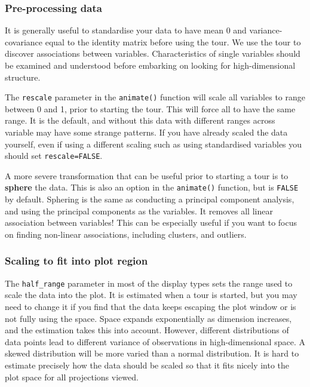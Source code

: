 \documentclass[
  letterpaper,
]{book}
\begin{document}
\hypertarget{pre-processing-data}{%
\subsubsection{Pre-processing data}\label{pre-processing-data}}

It is generally useful to standardise your data to have mean 0 and
variance-covariance equal to the identity matrix before using the tour.
We use the tour to discover associations between variables.
Characteristics of single variables should be examined and understood
before embarking on looking for high-dimensional structure.

The \texttt{rescale} parameter in the \texttt{animate()} function will
scale all variables to range between 0 and 1, prior to starting the
tour. This will force all to have the same range. It is the default, and
without this data with different ranges across variable may have some
strange patterns. If you have already scaled the data yourself, even if
using a different scaling such as using standardised variables you
should set \texttt{rescale=FALSE}.

A more severe transformation that can be useful prior to starting a tour
is to \textbf{sphere} the data. This is also an option in the
\texttt{animate()} function, but is \texttt{FALSE} by default. Sphering
is the same as conducting a principal component analysis, and using the
principal components as the variables. It removes all linear association
between variables! This can be especially useful if you want to focus on
finding non-linear associations, including clusters, and outliers.

\hypertarget{scaling-to-fit-into-plot-region}{%
\subsubsection{Scaling to fit into plot
region}\label{scaling-to-fit-into-plot-region}}

The \texttt{half\_range} parameter in most of the display types sets the
range used to scale the data into the plot. It is estimated when a tour
is started, but you may need to change it if you find that the data
keeps escaping the plot window or is not fully using the space. Space
expands exponentially as dimension increases, and the estimation takes
this into account. However, different distributions of data points lead
to different variance of observations in high-dimensional space. A
skewed distribution will be more varied than a normal distribution. It
is hard to estimate precisely how the data should be scaled so that it
fits nicely into the plot space for all projections viewed.
\end{document}
